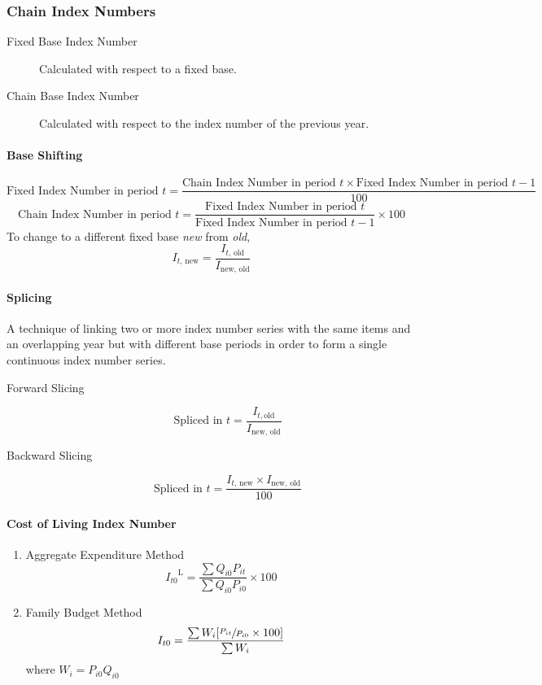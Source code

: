 \documentclass[
10pt, %
a4paper, %
]{report}
\begin{document}
\subsubsection{Chain Index Numbers}
\begin{description}
\item[Fixed Base Index Number] Calculated with respect to a fixed base.
\item[Chain Base Index Number] Calculated with respect to the index number of the previous year.
\end{description}

\paragraph*{Base Shifting}
\[
\text{Fixed Index Number in period } t = \frac{\text{Chain Index Number in period } t \times \text{Fixed Index Number in period } t-1}{100}
\]
\[
\text{Chain Index Number in period } t = \frac{\text{Fixed Index Number in period } t}{\text{Fixed Index Number in period } t-1} \times 100
\]
To change to a different fixed base \textit{new} from \textit{old},
\[
I_{t\text{, new}} = \frac{I_{t\text{, old}}}{I_{\text{new, old}}}
\]

\paragraph*{Splicing}
A technique of linking two or more index number series with the same items and an overlapping year but with different base periods in order to form a single continuous index number series.

\begin{description}
\item[Forward Slicing]
\[\text{Spliced in } t = \frac{I_{t, \text{old}}}{I_{\text{new, old}}}\]
\item[Backward Slicing]
\[
\text{Spliced in } t = \frac{I_{t\text{, new}} \times I_{\text{new, old}}}{100}
\]
\end{description}

\paragraph*{Cost of Living Index Number}
\begin{enumerate}
\item Aggregate Expenditure Method
\[{I_{t0}}^\mathrm{L} = \frac{\sum Q_{i0} P_{it}}{\sum Q_{i0} P_{i0}} \times 100\]
\item Family Budget Method
\[I_{t0} = \frac{\sum W_i [\sfrac{P_{it}}{P_{i0}} \times 100]}{\sum W_i}\]
where \(W_i = P_{i0}Q_{i0}\)
\end{enumerate}
\end{document}
